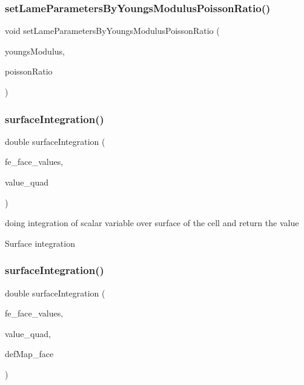 \subsubsection{\texorpdfstring{setLameParametersByYoungsModulusPoissonRatio()}{setLameParametersByYoungsModulusPoissonRatio()}}
{\footnotesize\ttfamily void set\+Lame\+Parameters\+By\+Youngs\+Modulus\+Poisson\+Ratio (\begin{DoxyParamCaption}\item[{double}]{youngs\+Modulus,  }\item[{double}]{poisson\+Ratio }\end{DoxyParamCaption})}

\mbox{\label{class_residual_ac48cd0a04f0d2f91a23e60135652d938}} 
\subsubsection{\texorpdfstring{surfaceIntegration()}{surfaceIntegration()}\hspace{0.1cm}{\footnotesize\ttfamily [1/6]}}
{\footnotesize\ttfamily double surface\+Integration (\begin{DoxyParamCaption}\item[{const F\+E\+Face\+Values$<$ dim $>$ \&}]{fe\+\_\+face\+\_\+values,  }\item[{double}]{value\+\_\+quad }\end{DoxyParamCaption})}

doing integration of scalar variable over surface of the cell and return the value

Surface integration \mbox{\label{class_residual_ad44c10c32c915ba9b431c0256a2769c2}} 
\subsubsection{\texorpdfstring{surfaceIntegration()}{surfaceIntegration()}\hspace{0.1cm}{\footnotesize\ttfamily [2/6]}}
{\footnotesize\ttfamily double surface\+Integration (\begin{DoxyParamCaption}\item[{const F\+E\+Face\+Values$<$ dim $>$ \&}]{fe\+\_\+face\+\_\+values,  }\item[{double}]{value\+\_\+quad,  }\item[{\mbox{\hyperlink{structdeformation_map}{deformation\+Map}}$<$ T, dim $>$ \&}]{def\+Map\+\_\+face }\end{DoxyParamCaption})}

